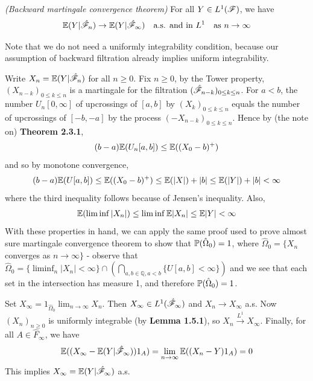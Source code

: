 \documentclass[12pt,a4paper]{report}
\newenvironment{proof}
{\begin{changemargin}{1cm}{0.5cm} 
	}%
	{\end{changemargin}
}
\begin{document}
 \emph{(Backward martingale convergence theorem)} For all $Y\in L^1(\mathscr{F})$, we have 
\begin{align*}
\mathbb{E}(Y|\hat{\mathscr{F}}_n) \rightarrow \mathbb{E}(Y|\hat{\mathscr{F}}_{\infty}) \quad \text{a.s. and in } L^1 \quad \text{as } n\rightarrow \infty
\end{align*}
\s

Note that we do not need a uniformly integrability condition, because our assumption of backward filtration already implies uniform integrability.
\begin{proof}
\pf Write $X_n = \mathbb{E}(Y|\hat{\mathscr{F}}_n)$ for all $n\geq 0$. Fix $n\geq 0$, by the Tower property, $(X_{n-k})_{0\leq k\leq n}$ is a martingale for the filtration $(\hat{\mathscr{F}}_{n-k})_{0\leq k\leq n}$. For $a<b$, the number $U_n[0,\infty]$ of upcrossings of $[a,b]$ by $(X_k)_{0\leq k \leq n}$ equals the number of upcrossings of $[-b,-a]$ by the process $(-X_{n-k})_{0\leq k\leq n}$. Hence by (the note on) \textbf{Theorem 2.3.1},
\begin{align*}
(b-a)\mathbb{E}(U_n [a,b]) \leq \mathbb{E}((X_0 -b)^+)
\end{align*}
and so by monotone convergence,
\begin{align*}
(b-a) \mathbb{E}(U[a,b]) \leq \mathbb{E}((X_0-b)^+) \leq \mathbb{E}(|X|) + |b| \leq \mathbb{E}(|Y|) + |b| <\infty
\end{align*}
where the third inequality follows because of Jensen's inequality. Also, 
\begin{align*}
\mathbb{E}(\liminf |X_n|) \leq \liminf \mathbb{E}|X_n| \leq \mathbb{E}|Y| < \infty
\end{align*}
With these properties in hand, we can apply the same proof used to prove almost sure martingale convergence theorem to show that $\mathbb{P}(\hat{\Omega}_0)=1$, where $\hat{\Omega}_0 = \{X_n$ converges as $n\rightarrow \infty \}$ - observe that $\hat{\Omega}_0 = \{\liminf_n |X_n| < \infty\} \cap (\bigcap_{a,b\in \mathbb{Q},a<b} \{ U[a,b]<\infty  \} )$ and we see that each set in the intersection has measure 1, and therefore $\mathbb{P}(\hat{\Omega}_0)=1$.

\quad Set $X_{\infty} = 1_{\hat{\Omega}_0} \lim_{n\rightarrow \infty} X_n$. Then $X_{\infty} \in L^1(\hat{\mathscr{F}}_{\infty})$ and $X_n \rightarrow X_{\infty}$ a.s. Now $(X_n)_{n\geq 0}$ is uniformly integrable (by \textbf{Lemma 1.5.1}), so $X_n\xrightarrow{L^1} X_{\infty}$. Finally, for all $A\in \hat{F}_{\infty}$, we have
\begin{align*}
\mathbb{E}((X_{\infty} - \mathbb{E}(Y|\hat{\mathscr{F}}_{\infty})) 1_A) = \lim_{n\rightarrow \infty} \mathbb{E}((X_n -Y)1_A) = 0
\end{align*}
This implies $X_{\infty} = \mathbb{E}(Y|\hat{\mathscr{F}}_{\infty})$ a.s.

\eop
\end{proof}
\end{document}

